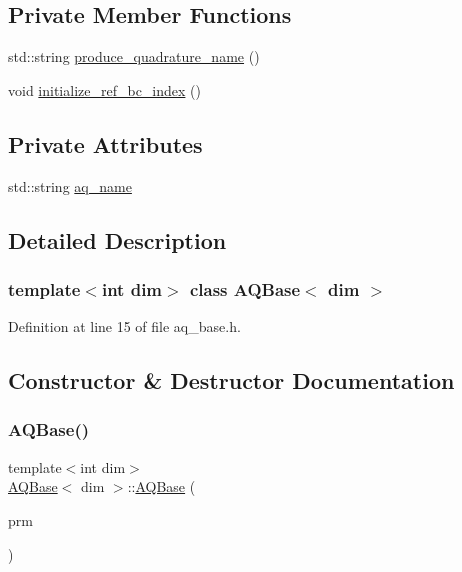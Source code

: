 \subsection*{Private Member Functions}
\begin{DoxyCompactItemize}
\item 
std\+::string \hyperlink{class_a_q_base_a4ae1370033705c82d08686fd651ad6e8}{produce\+\_\+quadrature\+\_\+name} ()
\item 
void \hyperlink{class_a_q_base_aafde5b4c9ce19b1c6c4a8d37787f13b2}{initialize\+\_\+ref\+\_\+bc\+\_\+index} ()
\end{DoxyCompactItemize}
\subsection*{Private Attributes}
\begin{DoxyCompactItemize}
\item 
std\+::string \hyperlink{class_a_q_base_a3e50d2d59d1a4a2fabed3c4852f80c49}{aq\+\_\+name}
\end{DoxyCompactItemize}


\subsection{Detailed Description}
\subsubsection*{template$<$int dim$>$\newline
class A\+Q\+Base$<$ dim $>$}



Definition at line 15 of file aq\+\_\+base.\+h.



\subsection{Constructor \& Destructor Documentation}
\mbox{\label{class_a_q_base_a3a05ceb6b201b4e6e605b260d766842d}} 
\subsubsection{\texorpdfstring{A\+Q\+Base()}{AQBase()}}
{\footnotesize\ttfamily template$<$int dim$>$ \\
\hyperlink{class_a_q_base}{A\+Q\+Base}$<$ dim $>$\+::\hyperlink{class_a_q_base}{A\+Q\+Base} (\begin{DoxyParamCaption}\item[{Parameter\+Handler \&}]{prm }\end{DoxyParamCaption})}



